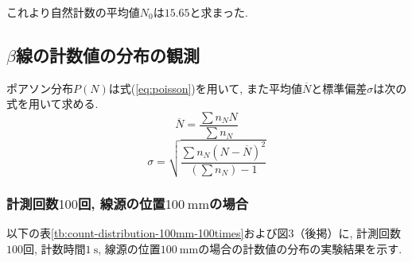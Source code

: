 \documentclass{jarticle}
\begin{document}

これより自然計数の平均値$N_0$は$15.65$と求まった.


\subsection{$\beta$線の計数値の分布の観測}

ポアソン分布$P(N)$は式(\ref{eq:poisson})を用いて, また平均値$\overline{N}$と標準偏差$\sigma$は次の式を用いて求める.
\begin{equation}
  \overline{N} = \frac{\sum n_N N}{\sum n_N}
\end{equation}
\begin{equation}
  \sigma = \sqrt{\frac{\sum n_N (N-\overline{N})^2}{(\sum n_N) - 1}}
\end{equation}


\subsubsection{計測回数$100$回, 線源の位置$100\ \mathrm{mm}$の場合}

以下の表\ref{tb:count-distribution-100mm-100times}および図3（後掲）に, 計測回数$100$回, 計数時間$1\ \mathrm{s}$, 線源の位置$100\ \mathrm{mm}$の場合の計数値の分布の実験結果を示す.
\end{document}
